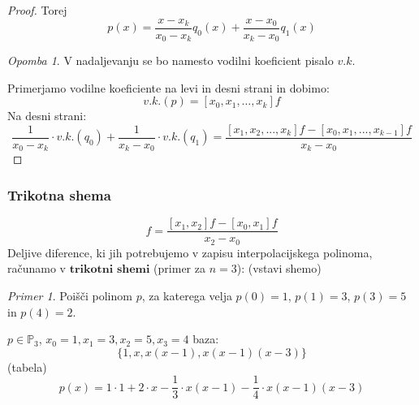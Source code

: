 \documentclass[a4paper,12pt]{article}
\theoremstyle{definition}
\theoremstyle{remark}
\newtheorem*{ex}{Primer}
\newtheorem*{rem}{Opomba}
\newcommand{\Pp}{\mathbb{P}}
\begin{document}
\begin{proof}
    Torej
    \begin{equation*}
        p(x) = \frac{x-x_k}{x_0-x_k} q_0(x) + \frac{x-x_0}{x_k-x_0} q_1(x)
    \end{equation*}
    \begin{rem}
        V nadaljevanju se bo namesto vodilni koeficient pisalo $v.k.$
    \end{rem}
    Primerjamo vodilne koeficiente na levi in desni strani in dobimo:
    \begin{equation*}
        v.k.(p) = [x_0, x_1, \dots, x_k]f
    \end{equation*}
    Na desni strani:
    \begin{equation*}
        \frac{1}{x_0-x_k} \cdot v.k. (q_0) + \frac{1}{x_k - x_0} \cdot v.k. (q_1) = \frac{[x_1, x_2, ..., x_k] f - [x_0, x_1, ..., x_{k-1}] f}{x_k - x_0}
    \end{equation*}
\end{proof}

\subsubsection*{Trikotna shema}
\begin{equation*}
    [x_0, x_1, x_2] f = \frac{[x_1, x_2]f - [x_0, x_1] f}{x_2 - x_0}
\end{equation*}
Deljive diference, ki jih potrebujemo v zapisu interpolacijskega polinoma, računamo v $\textbf{trikotni shemi}$ (primer za $n = 3$):
(vstavi shemo)


\begin{ex}
    Poišči polinom $p$, za katerega velja $p(0) = 1$, $p(1) = 3$, $p(3) = 5$ in $p(4) = 2$.

    $p \in \Pp_3$, $x_0 = 1, x_1 =3,  x_2 = 5, x_3 = 4$
    baza:
    \begin{equation*}
        \{1, x, x(x-1), x(x-1)(x-3)\}
    \end{equation*}
    (tabela)
    \begin{equation*}
        p(x) = 1 \cdot 1 + 2 \cdot x - \frac{1}{3} \cdot x(x-1) - \frac{1}{4} \cdot x(x-1)(x-3)
    \end{equation*}
\end{ex}
\end{document}
